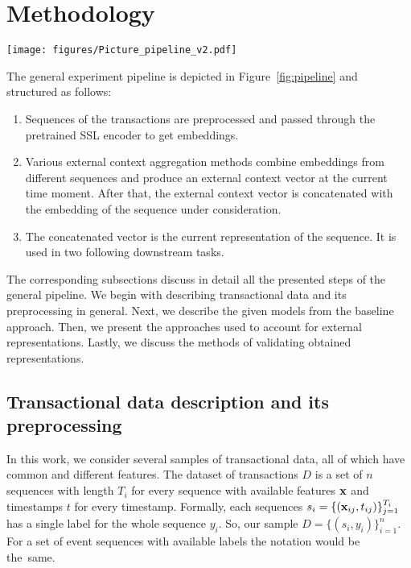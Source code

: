\section{Methodology}\label{sec:methods}

\begin{figure*}[!t]
     \centering
     \texttt{[image: figures/Picture\_pipeline\_v2.pdf]}
     \caption{General pipeline for external context generation to integrate it with a vanilla internal context followed by the considered validation procedures.}
     \label{fig:pipeline}
\end{figure*}

The general experiment pipeline is depicted in Figure~\ref{fig:pipeline} and structured as follows:
\begin{enumerate}
    \item Sequences of the transactions are preprocessed and passed through the pretrained SSL encoder to get embeddings.
    \item Various external context aggregation methods combine embeddings from different sequences and produce an external context vector at the current time moment. After that, the external context vector is concatenated with the embedding of the sequence under consideration. 
    \item The concatenated vector is the current representation of the sequence. It is used in two following downstream tasks. 
\end{enumerate}
The corresponding subsections discuss in detail all the presented steps of the general pipeline. 
We begin with describing transactional data and its preprocessing in general. 
Next, we describe the given models from the baseline approach. 
Then, we present the approaches used to account for external representations. 
Lastly, we discuss the methods of validating obtained representations.



\subsection{Transactional data description and its preprocessing}

In this work, we consider several samples of transactional data, all of which have common and different features. The dataset of transactions $D$ is a set of $n$ sequences with length $T_i$ for every sequence with available features $\mathbf{x}$ and timestamps $t$ for every timestamp.
Formally, each sequences $s_i = \{(\mathbf{x}_{ij}, t_{ij})\}_{j = 1}^{T_i}$ has a single label for the whole sequence $y_i$.
So, our sample $D = \{(s_i, y_i)\}_{i = 1}^n$.
For a set of event sequences with available labels the notation would be the~same.

